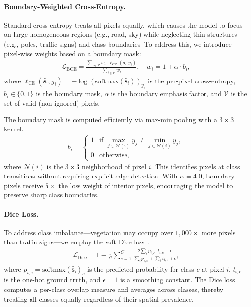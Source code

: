 \paragraph{Boundary-Weighted Cross-Entropy.}
Standard cross-entropy treats all pixels equally, which causes the model to focus on large homogeneous regions (e.g., road, sky) while neglecting thin structures (e.g., poles, traffic signs) and class boundaries. To address this, we introduce pixel-wise weights based on a boundary mask:
\begin{align}
    \mathcal{L}_{\text{BCE}} = \frac{\sum_{i \in \mathcal{V}} w_i \cdot \ell_{\text{CE}}(\hat{\mathbf{s}}_i, y_i)}{\sum_{i \in \mathcal{V}} w_i}, \quad w_i = 1 + \alpha \cdot b_i,
    \label{eq:bce_loss}
\end{align}
where $\ell_{\text{CE}}(\hat{\mathbf{s}}_i, y_i) = -\log\!\left(\text{softmax}(\hat{\mathbf{s}}_i)\right)_{y_i}$ is the per-pixel cross-entropy, $b_i \in \{0, 1\}$ is the boundary mask, $\alpha$ is the boundary emphasis factor, and $\mathcal{V}$ is the set of valid (non-ignored) pixels.

The boundary mask is computed efficiently via max-min pooling with a $3 \times 3$ kernel:
\begin{align}
    b_i = \begin{cases} 1 & \text{if } \max_{j \in \mathcal{N}(i)} y_j \neq \min_{j \in \mathcal{N}(i)} y_j, \\ 0 & \text{otherwise,}\end{cases}
    \label{eq:boundary_mask}
\end{align}
where $\mathcal{N}(i)$ is the $3 \times 3$ neighborhood of pixel $i$. This identifies pixels at class transitions without requiring explicit edge detection. With $\alpha = 4.0$, boundary pixels receive $5\times$ the loss weight of interior pixels, encouraging the model to preserve sharp class boundaries.

\paragraph{Dice Loss.}
To address class imbalance---vegetation may occupy over $1{,}000\times$ more pixels than traffic signs---we employ the soft Dice loss~\cite{milletari2016vnet}:
\begin{align}
    \mathcal{L}_{\text{Dice}} = 1 - \frac{1}{C} \sum_{c=1}^{C} \frac{2 \sum_i p_{i,c} \cdot t_{i,c} + \epsilon}{\sum_i p_{i,c} + \sum_i t_{i,c} + \epsilon},
    \label{eq:dice_loss}
\end{align}
where $p_{i,c} = \text{softmax}(\hat{\mathbf{s}}_i)_c$ is the predicted probability for class $c$ at pixel $i$, $t_{i,c}$ is the one-hot ground truth, and $\epsilon = 1$ is a smoothing constant. The Dice loss computes a per-class overlap measure and averages across classes, thereby treating all classes equally regardless of their spatial prevalence.

